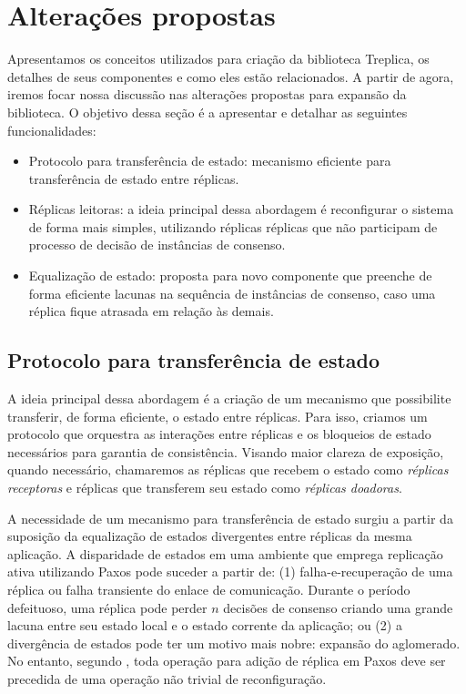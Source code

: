 \section{Alterações propostas}\label{sec:alteracoes_propostas}

Apresentamos os conceitos utilizados para criação da biblioteca Treplica, os detalhes de
seus componentes e como eles estão relacionados. A partir de agora, iremos focar nossa
discussão nas alterações propostas para expansão da biblioteca. O objetivo dessa seção é a
apresentar e detalhar as seguintes funcionalidades:

\begin{itemize}
  \item Protocolo para transferência de estado: mecanismo eficiente para transferência de
    estado entre réplicas.
  \item Réplicas leitoras: a ideia principal dessa abordagem é reconfigurar o sistema de
    forma mais simples, utilizando réplicas réplicas que não participam de processo de
    decisão de instâncias de consenso.
  \item Equalização de estado: proposta para novo componente que preenche de forma
    eficiente lacunas na sequência de instâncias de consenso, caso uma réplica fique
    atrasada em relação às demais.
\end{itemize}

\subsection{Protocolo para transferência de estado}

A ideia principal dessa abordagem é a criação de um mecanismo que possibilite transferir, de
forma eficiente, o estado entre réplicas. Para isso, criamos um protocolo que orquestra as
interações entre réplicas e os bloqueios de estado necessários para garantia de
consistência. Visando maior clareza de exposição, quando necessário, chamaremos as
réplicas que recebem o estado como \emph{réplicas receptoras} e réplicas que transferem
seu estado como \emph{réplicas doadoras}.

A necessidade de um mecanismo para transferência de estado surgiu a partir da suposição da
equalização de estados divergentes entre réplicas da mesma aplicação. A disparidade de
estados em uma ambiente que emprega replicação ativa utilizando Paxos pode suceder a
partir de: (1) falha-e-recuperação de uma réplica ou falha transiente do enlace de
comunicação. Durante o período defeituoso, uma réplica pode perder $n$ decisões de
consenso criando uma grande lacuna entre seu estado local e o estado corrente da
aplicação; ou (2) a divergência de estados pode ter um motivo mais nobre: expansão do
aglomerado. No entanto, segundo , toda operação para adição de
réplica em Paxos deve ser precedida de uma operação não trivial de reconfiguração.

